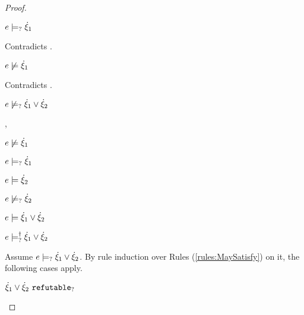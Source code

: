 \begin{proof}
\begin{byCases}
\begin{byCases}
\begin{byCases}
        \item[\text{(\ref{rule:CMSOr1})}]
            \begin{pfsteps*}
            \item $e \models_{?} \dot{\xi}_1$ 
            \end{pfsteps*}
            Contradicts .
        \item[\text{(\ref{rule:CMSOr2})}]
            \begin{pfsteps*}
            \item $e \not\models \dot{\xi}_1$ 
            \end{pfsteps*}
            Contradicts .
        \end{byCases}
        \begin{pfsteps*}
        \item $e \not\models_{?} \dot{\xi}_1 \vee \dot{\xi}_2$ 
        \end{pfsteps*}
    \item[\cmaysatisfy{e}{\hxi_1},\csatisfy{e}{\hxi_2}]
        \begin{pfsteps*}
        \item $e \not\models \dot{\xi}_1$  
        \item $e \models_{?} \dot{\xi}_1$  
        \item $e \models \dot{\xi}_2$  
        \item $e \not\models_{?} \dot{\xi}_2$  
        \item $e \models \dot{\xi}_1 \vee \dot{\xi}_2$  
        \item $e \models_{?}^{\dag} \dot{\xi}_1 \vee \dot{\xi}_2$ 
        \end{pfsteps*}
        Assume $e \models_{?} \dot{\xi}_1 \vee \dot{\xi}_2$. By rule induction over Rules (\ref{rules:MaySatisfy}) on it, the following cases apply.
        \begin{byCases}
        \item[\text{(\ref{rule:CMSNotIntro})}]
            \begin{pfsteps*}
            \item $\dot{\xi}_1 \vee \dot{\xi}_2 ~\mathtt{refutable}_?$ 

\end{pfsteps*}
\end{byCases}
\end{byCases}
\end{byCases}
\end{proof}
